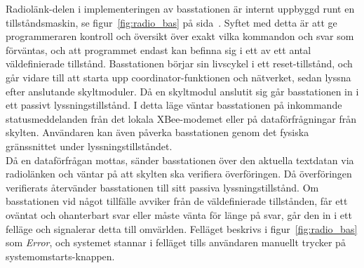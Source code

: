 \documentclass[a4paper,11pt]{article}
\begin{document}
Radiolänk-delen i implementeringen av basstationen är internt uppbyggd runt en tillståndsmaskin, se figur~\ref{fig:radio_bas} på sida~\pageref{fig:radio_bas}. Syftet med detta är att ge programmeraren kontroll och översikt över exakt vilka kommandon och svar som förväntas, och att programmet endast kan befinna sig i ett av ett antal väldefinierade tillstånd. Basstationen börjar sin livscykel i ett reset-tillstånd, och går vidare till att starta upp coordinator-funktionen och nätverket, sedan lyssna efter anslutande skyltmoduler. Då en skyltmodul anslutit sig går basstationen in i ett passivt lyssningstillstånd. I detta läge väntar basstationen på inkommande statusmeddelanden från det lokala XBee-modemet eller på dataförfrågningar från skylten. Användaren kan även påverka basstationen genom det fysiska gränssnittet under lyssningstillståndet. \\

Då en dataförfrågan mottas, sänder basstationen över den aktuella textdatan via radiolänken och väntar på att skylten ska verifiera överföringen. Då överföringen verifierats återvänder basstationen till sitt passiva lyssningstillstånd. Om basstationen vid något tillfälle avviker från de väldefinierade tillstånden, får ett oväntat och ohanterbart svar eller måste vänta för länge på svar, går den in i ett felläge och signalerar detta till omvärlden. Felläget beskrivs i figur~\ref{fig:radio_bas} som {\it Error}, och systemet stannar i felläget tills användaren manuellt trycker på systemomstarts-knappen. \\
\end{document}
